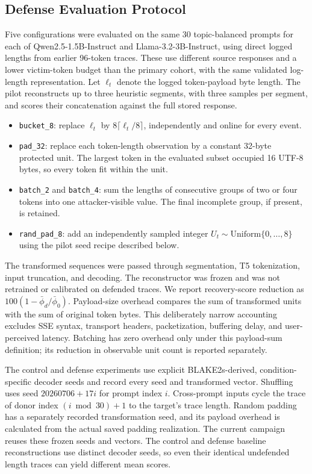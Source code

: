 \documentclass[electronics,article,submit,pdftex,moreauthors]{Definitions/mdpi}
\begin{document}
\subsection{Defense Evaluation Protocol}
Five configurations were evaluated on the same 30 topic-balanced prompts for each of Qwen2.5-1.5B-Instruct and Llama-3.2-3B-Instruct, using direct logged lengths from earlier 96-token traces. These use different source responses and a lower victim-token budget than the primary cohort, with the same validated log-length representation. Let $\ell_t$ denote the logged token-payload byte length. The pilot reconstructs up to three heuristic segments, with three samples per segment, and scores their concatenation against the full stored response.
\begin{itemize}[leftmargin=2em]
    \item \texttt{bucket\_8}: replace $\ell_t$ by $8\lceil \ell_t/8\rceil$, independently and online for every event.
    \item \texttt{pad\_32}: replace each token-length observation by a constant 32-byte protected unit. The largest token in the evaluated subset occupied 16 UTF-8 bytes, so every token fit within the unit.
    \item \texttt{batch\_2} and \texttt{batch\_4}: sum the lengths of consecutive groups of two or four tokens into one attacker-visible value. The final incomplete group, if present, is retained.
    \item \texttt{rand\_pad\_8}: add an independently sampled integer $U_t\sim\mathrm{Uniform}\{0,\ldots,8\}$ using the pilot seed recipe described below.
\end{itemize}
The transformed sequences were passed through segmentation, T5 tokenization, input truncation, and decoding. The reconstructor was frozen and was not retrained or calibrated on defended traces. We report recovery-score reduction as $100(1-\bar\phi_d/\bar\phi_0)$. Payload-size overhead compares the sum of transformed units with the sum of original token bytes. This deliberately narrow accounting excludes SSE syntax, transport headers, packetization, buffering delay, and user-perceived latency. Batching has zero overhead only under this payload-sum definition; its reduction in observable unit count is reported separately.

The control and defense experiments use explicit BLAKE2s-derived, condition-specific decoder seeds and record every seed and transformed vector. Shuffling uses seed $20260706+17i$ for prompt index $i$. Cross-prompt inputs cycle the trace of donor index $(i\bmod30)+1$ to the target's trace length. Random padding has a separately recorded transformation seed, and its payload overhead is calculated from the actual saved padding realization. The current campaign reuses these frozen seeds and vectors. The control and defense baseline reconstructions use distinct decoder seeds, so even their identical undefended length traces can yield different mean scores.
\end{document}
